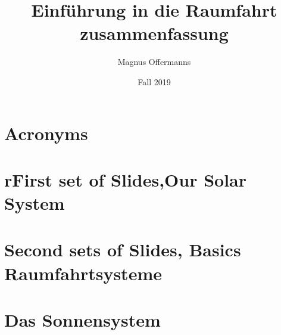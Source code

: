\documentclass{article}
\title{Einführung in die Raumfahrt zusammenfassung}
\author{Magnus Offermanns}
\date{Fall 2019}
\begin{document}
\maketitle
\tableofcontents
\section{Acronyms}


\section{rFirst set of Slides,Our Solar System}


\section{Second sets of Slides, Basics Raumfahrtsysteme}


\section{Das Sonnensystem}

\end{document}
